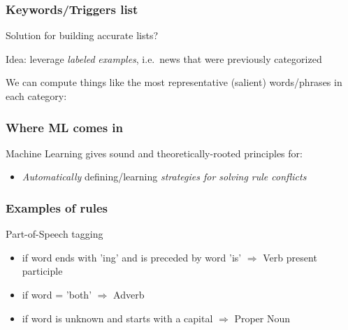 \documentclass[usenames,dvipsnames]{beamer}
\newcommand{\voc}[1]{\emph{\color{ForestGreen}#1}}
\begin{document}
\begin{frame}\frametitle{Keywords/Triggers list}

Solution for building accurate lists?
\pause

\vspace{0.4cm}
Idea: leverage \voc{labeled} \voc{examples}, i.e.\ news that were
previously categorized

\vspace{0.4cm}
We can compute things like the most representative (salient) words/phrases in each category:





\end{frame}


\begin{frame}\frametitle{Where ML comes in}

\begin{block}{Machine Learning gives sound and theoretically-rooted principles for:}
\begin{itemize}
\item \emph{Automatically} defining/learning \voc{strategies for solving rule conflicts}
\end{itemize}
\end{block}

\end{frame}


\begin{frame}\frametitle{Examples of rules}

Part-of-Speech tagging
\begin{itemize}
\item if word ends with 'ing' and is preceded by word 'is'
  $\Rightarrow$ Verb present participle
\item if word = 'both' $\Rightarrow$ Adverb
\item if word is unknown and starts with a capital $\Rightarrow$
  Proper Noun
\end{itemize}
\end{frame}
\end{document}
